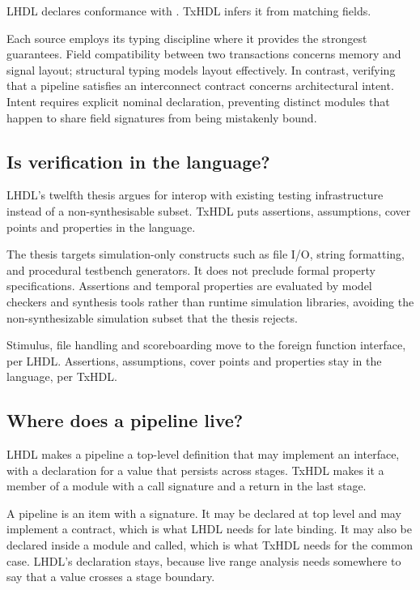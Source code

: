LHDL declares conformance with . TxHDL infers it from
matching fields.

\begin{rulebox}
Each source employs its typing discipline where it provides the strongest
guarantees. Field compatibility between two transactions concerns memory and
signal layout; structural typing models layout effectively. In contrast,
verifying that a pipeline satisfies an interconnect contract concerns
architectural intent. Intent requires explicit nominal declaration, preventing
distinct modules that happen to share field signatures from being mistakenly
bound.
\end{rulebox}

\subsection{Is verification in the language?}

LHDL's twelfth thesis argues for interop with existing testing
infrastructure instead of a non-synthesisable subset. TxHDL puts assertions,
assumptions, cover points and properties in the language.

\begin{rulebox}
The thesis targets simulation-only constructs such as file I/O, string
formatting, and procedural testbench generators. It does not preclude formal
property specifications. Assertions and temporal properties are evaluated by
model checkers and synthesis tools rather than runtime simulation libraries,
avoiding the non-synthesizable simulation subset that the thesis rejects.
\end{rulebox}

Stimulus, file handling and scoreboarding move to the foreign function
interface, per LHDL. Assertions, assumptions, cover points and properties
stay in the language, per TxHDL.

\subsection{Where does a pipeline live?}

LHDL makes a pipeline a top-level definition that may implement an
interface, with a  declaration for a value that persists across
stages. TxHDL makes it a member of a module with a call signature and a
return in the last stage.

\begin{rulebox}
A pipeline is an item with a signature. It may be declared at top level and
may implement a contract, which is what LHDL needs for late binding. It may
also be declared inside a module and called, which is what TxHDL needs for
the common case. LHDL's  declaration stays, because live range
analysis needs somewhere to say that a value crosses a stage boundary.
\end{rulebox}
